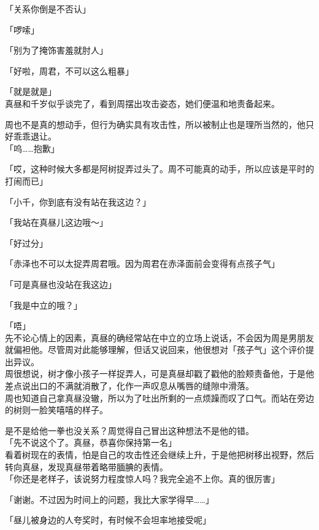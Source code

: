 「关系你倒是不否认」

「啰嗦」

「别为了掩饰害羞就肘人」

「好啦，周君，不可以这么粗暴」

「就是就是」\\

真昼和千岁似乎谈完了，看到周摆出攻击姿态，她们便温和地责备起来。

周也不是真的想动手，但行为确实具有攻击性，所以被制止也是理所当然的，他只好乖乖退让。\\

「呜……抱歉」

「哎，这种时候大多都是阿树捉弄过头了。周不可能真的动手，所以应该是平时的打闹而已」

「小千，你到底有没有站在我这边？」

「我站在真昼儿这边哦～」

「好过分」

「赤泽也不可以太捉弄周君哦。因为周君在赤泽面前会变得有点孩子气」

「可是真昼也没站在我这边」

「我是中立的哦？」

「唔」\\

先不论心情上的因素，真昼的确经常站在中立的立场上说话，不会因为周是男朋友就偏袒他。尽管周对此能够理解，但话又说回来，他很想对「孩子气」这个评价提出异议。\\

周很想说，树才像小孩子一样捉弄人，可是真昼却戳了戳他的脸颊责备他，于是他差点说出口的不满就消散了，化作一声叹息从嘴唇的缝隙中滑落。\\

周也知道自己拿真昼没辙，所以为了吐出所剩的一点烦躁而叹了口气。而站在旁边的树则一脸笑嘻嘻的样子。

是不是给他一拳也没关系？周觉得自己冒出这种想法不是他的错。\\

「先不说这个了。真昼，恭喜你保持第一名」\\

看着树现在的表情，怕是自己的攻击性还会继续上升，于是他把树移出视野，然后转向真昼，发现真昼带着略带腼腆的表情。\\

「你还是老样子，该说努力程度惊人吗？我完全追不上你。真的很厉害」

「谢谢。不过因为时间上的问题，我比大家学得早……」

「昼儿被身边的人夸奖时，有时候不会坦率地接受呢」


